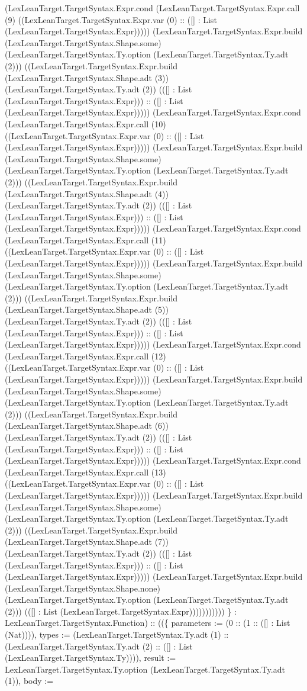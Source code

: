 \documentclass[11pt]{article}
\begin{document}
(LexLeanTarget.TargetSyntax.Expr.cond (LexLeanTarget.TargetSyntax.Expr.call (9) ((LexLeanTarget.TargetSyntax.Expr.var (0) :: ([] : List (LexLeanTarget.TargetSyntax.Expr))))) (LexLeanTarget.TargetSyntax.Expr.build (LexLeanTarget.TargetSyntax.Shape.some) (LexLeanTarget.TargetSyntax.Ty.option (LexLeanTarget.TargetSyntax.Ty.adt (2))) ((LexLeanTarget.TargetSyntax.Expr.build (LexLeanTarget.TargetSyntax.Shape.adt (3)) (LexLeanTarget.TargetSyntax.Ty.adt (2)) (([] : List (LexLeanTarget.TargetSyntax.Expr))) :: ([] : List (LexLeanTarget.TargetSyntax.Expr))))) (LexLeanTarget.TargetSyntax.Expr.cond (LexLeanTarget.TargetSyntax.Expr.call (10) ((LexLeanTarget.TargetSyntax.Expr.var (0) :: ([] : List (LexLeanTarget.TargetSyntax.Expr))))) (LexLeanTarget.TargetSyntax.Expr.build (LexLeanTarget.TargetSyntax.Shape.some) (LexLeanTarget.TargetSyntax.Ty.option (LexLeanTarget.TargetSyntax.Ty.adt (2))) ((LexLeanTarget.TargetSyntax.Expr.build (LexLeanTarget.TargetSyntax.Shape.adt (4)) (LexLeanTarget.TargetSyntax.Ty.adt (2)) (([] : List (LexLeanTarget.TargetSyntax.Expr))) :: ([] : List (LexLeanTarget.TargetSyntax.Expr))))) (LexLeanTarget.TargetSyntax.Expr.cond (LexLeanTarget.TargetSyntax.Expr.call (11) ((LexLeanTarget.TargetSyntax.Expr.var (0) :: ([] : List (LexLeanTarget.TargetSyntax.Expr))))) (LexLeanTarget.TargetSyntax.Expr.build (LexLeanTarget.TargetSyntax.Shape.some) (LexLeanTarget.TargetSyntax.Ty.option (LexLeanTarget.TargetSyntax.Ty.adt (2))) ((LexLeanTarget.TargetSyntax.Expr.build (LexLeanTarget.TargetSyntax.Shape.adt (5)) (LexLeanTarget.TargetSyntax.Ty.adt (2)) (([] : List (LexLeanTarget.TargetSyntax.Expr))) :: ([] : List (LexLeanTarget.TargetSyntax.Expr))))) (LexLeanTarget.TargetSyntax.Expr.cond (LexLeanTarget.TargetSyntax.Expr.call (12) ((LexLeanTarget.TargetSyntax.Expr.var (0) :: ([] : List (LexLeanTarget.TargetSyntax.Expr))))) (LexLeanTarget.TargetSyntax.Expr.build (LexLeanTarget.TargetSyntax.Shape.some) (LexLeanTarget.TargetSyntax.Ty.option (LexLeanTarget.TargetSyntax.Ty.adt (2))) ((LexLeanTarget.TargetSyntax.Expr.build (LexLeanTarget.TargetSyntax.Shape.adt (6)) (LexLeanTarget.TargetSyntax.Ty.adt (2)) (([] : List (LexLeanTarget.TargetSyntax.Expr))) :: ([] : List (LexLeanTarget.TargetSyntax.Expr))))) (LexLeanTarget.TargetSyntax.Expr.cond (LexLeanTarget.TargetSyntax.Expr.call (13) ((LexLeanTarget.TargetSyntax.Expr.var (0) :: ([] : List (LexLeanTarget.TargetSyntax.Expr))))) (LexLeanTarget.TargetSyntax.Expr.build (LexLeanTarget.TargetSyntax.Shape.some) (LexLeanTarget.TargetSyntax.Ty.option (LexLeanTarget.TargetSyntax.Ty.adt (2))) ((LexLeanTarget.TargetSyntax.Expr.build (LexLeanTarget.TargetSyntax.Shape.adt (7)) (LexLeanTarget.TargetSyntax.Ty.adt (2)) (([] : List (LexLeanTarget.TargetSyntax.Expr))) :: ([] : List (LexLeanTarget.TargetSyntax.Expr))))) (LexLeanTarget.TargetSyntax.Expr.build (LexLeanTarget.TargetSyntax.Shape.none) (LexLeanTarget.TargetSyntax.Ty.option (LexLeanTarget.TargetSyntax.Ty.adt (2))) (([] : List (LexLeanTarget.TargetSyntax.Expr))))))))))) \} : LexLeanTarget.TargetSyntax.Function) :: ((\{ parameters := (0 :: (1 :: ([] : List (Nat)))), types := (LexLeanTarget.TargetSyntax.Ty.adt (1) :: (LexLeanTarget.TargetSyntax.Ty.adt (2) :: ([] : List (LexLeanTarget.TargetSyntax.Ty)))), result := LexLeanTarget.TargetSyntax.Ty.option (LexLeanTarget.TargetSyntax.Ty.adt (1)), body := 
\end{document}
